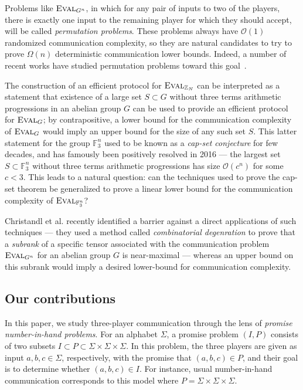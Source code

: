 \documentclass[10pt,a4paper]{article}
\newcommand{\F}{\mathbb{F}}
\newcommand{\bZ}{\mathbb{Z}}
\newcommand{\eval}{\textsc{Eval}}
\newcommand{\Oh}{\mathcal{O}}
\newcommand{\jnote}[1]{\todo[inline, color=blue!30!white]{#1 \\ -\textsc{Jarek}}}
\begin{document}
Problems like $\eval_{G^n}$, in which for any pair of inputs to two of the players, there is exactly one input to the remaining player for which they should accept, will be called \emph{permutation problems}. These problems always have $\Oh(1)$ randomized communication complexity, so they are natural candidates to try to prove $\Omega(n)$ deterministic communication lower bounds. Indeed, a number of recent works have studied permutation problems toward this goal~\cite{BDPW10,CFTZ21}.

The construction \cite{CFL83} of an efficient protocol for $\eval_{\bZ_N}$ can be interpreted as a statement that existence of a large set $S \subset G$ without three terms arithmetic progressions in an abelian group $G$ can be used to provide an efficient protocol for $\eval_{G}$; by contrapositive, a lower bound for the communication complexity of $\eval_G$ would imply an upper bound for the size of any such set $S$. This latter statement for the group $\F_3^n$ used to be known as a \emph{cap-set conjecture} for few decades, and has famously been positively resolved in 2016 \cite{ED17,CLP17, T16} --- the largest set $S \subset \F_3^n$ without three terms arithmetic progressions has size $\Oh(c^n)$ for some $c < 3$. This leads to a natural question: can the techniques used to prove the cap-set theorem be generalized to prove a linear lower bound for the communication complexity of $\eval_{\F_3^n}$?

 Christandl et al. \cite{CFTZ21} recently identified a barrier against a direct applications of such techniques --- they used a method called \emph{combinatorial degenration} to prove that a \emph{subrank} of a specific tensor associated with the communication problem $\eval_{G^n}$ for an abelian group $G$ is near-maximal --- whereas an upper bound on this subrank would imply a desired lower-bound for communication complexity.



\subsection{Our contributions}
In this paper, we study three-player communication through the lens of \emph{promise number-in-hand problems}. For an alphabet $\Sigma$, a promise problem $(I,P)$ consists of two subsets $I \subset P \subset \Sigma \times \Sigma \times \Sigma$. In this problem, the three players are given as input $a,b,c \in \Sigma$, respectively, with the promise that $(a,b,c) \in P$, and their goal is to determine whether $(a,b,c) \in I$. For instance, usual number-in-hand communication corresponds to this model where $P = \Sigma \times \Sigma \times \Sigma$.
\end{document}
